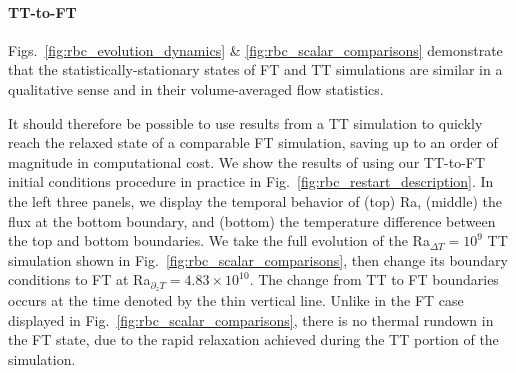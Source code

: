 \documentclass[aps, pre, onecolumn, nofootinbib, notitlepage, groupedaddress, amsfonts, amssymb, amsmath, longbibliography, superscriptaddress]{revtex4-1}
\newcommand{\ea}[1]{{\color{red} #1}}
\begin{document}
\ea{\paragraph{TT-to-FT} Figs.~\ref{fig:rbc_evolution_dynamics} \& \ref{fig:rbc_scalar_comparisons} demonstrate that the statistically-stationary states of FT and TT simulations are similar in a qualitative sense and in their volume-averaged flow statistics.}
It should therefore be possible to use results from a TT simulation to quickly reach the relaxed state of a comparable FT simulation, saving up to an order of magnitude in computational cost.
We show \ea{the results of using our TT-to-FT initial conditions procedure} in practice in Fig.~\ref{fig:rbc_restart_description}.
In the left three panels, we display the temporal behavior of (top) Ra, (middle) the flux at the bottom boundary, and (bottom) the temperature difference between the top and bottom boundaries.
We take the full evolution of the Ra$_{\Delta T} = 10^9$ TT simulation shown in Fig.~\ref{fig:rbc_scalar_comparisons}, then change its boundary conditions to FT at Ra$_{\partial_z T} = 4.83\times 10^{10}$.
The change from TT to FT boundaries occurs at the time denoted by the thin vertical line.
Unlike in the FT case displayed in Fig.~\ref{fig:rbc_scalar_comparisons}, there is no thermal rundown in the FT state, due to the rapid relaxation achieved during the TT portion of the simulation.
\end{document}
